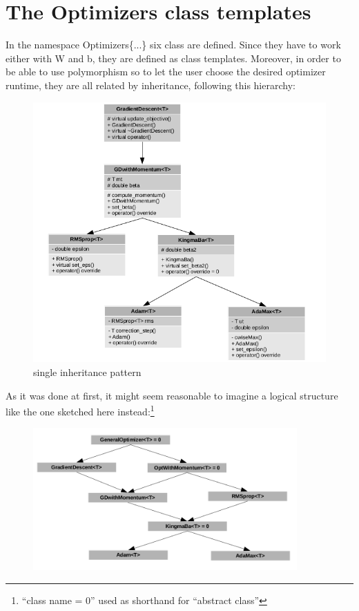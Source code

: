 \documentclass[12pt, a4paper]{report}
\theoremstyle{definition}
\begin{document}
{\newpage
\section{The Optimizers class templates}\label{section3.3}
In the {\ttfamily namespace Optimizers\{...\}} six class are defined. Since they have to work either with {\ttfamily W} and {\ttfamily b}, they are defined as class templates. Moreover, in order to be able to use polymorphism so to let the user choose the desired optimizer runtime, they are all related by inheritance, following this hierarchy:
\begin{figure}[H]
	\centering
	\includegraphics[width=\textwidth]{img/classes1}
	\caption{single inheritance pattern}\label{fig9}
\end{figure}
\newpage \noindent As it was done at first, it might seem reasonable to imagine a logical structure like the one sketched here instead:\footnote{``class name = 0'' used as shorthand for ``abstract class''}
\begin{figure}[H]
	\centering
	\includegraphics[width=0.9\textwidth]{img/classes2}

\end{figure}}
\end{document}
